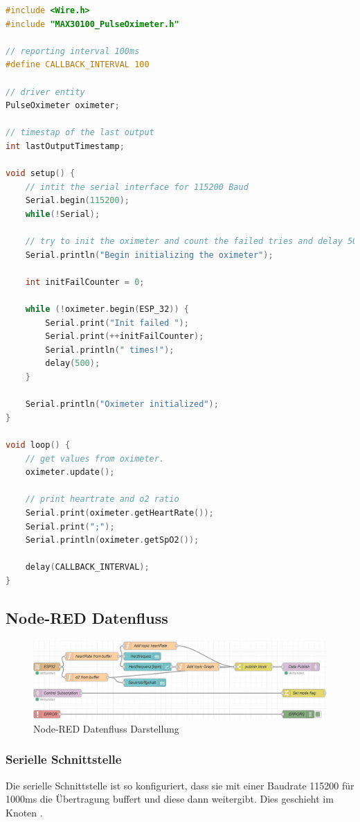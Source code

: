 \documentclass[12pt,oneside]{article}
\newcommand{\quoteM}[1]{\glqq {#1}\grqq{}}
\begin{document}
  \begin{lstlisting}[language=C, caption={Quellcode des ESP32-Programms}, captionpos=b, label=srcEsp]
#include <Wire.h>
#include "MAX30100_PulseOximeter.h"

// reporting interval 100ms
#define CALLBACK_INTERVAL 100

// driver entity
PulseOximeter oximeter;

// timestap of the last output
int lastOutputTimestamp;

void setup() {
	// intit the serial interface for 115200 Baud
	Serial.begin(115200);
	while(!Serial);
	
	// try to init the oximeter and count the failed tries and delay 500ms.
	Serial.println("Begin initializing the oximeter");
	
	int initFailCounter = 0;
	
	while (!oximeter.begin(ESP_32)) {
		Serial.print("Init failed ");
		Serial.print(++initFailCounter);
		Serial.println(" times!");
		delay(500);
	}
	
	Serial.println("Oximeter initialized");
}

void loop() {
	// get values from oximeter.
	oximeter.update();
	
	// print heartrate and o2 ratio
	Serial.print(oximeter.getHeartRate());
	Serial.print(";");
	Serial.println(oximeter.getSpO2());
	
	delay(CALLBACK_INTERVAL);
}
  \end{lstlisting}

  \subsection{Node-RED Datenfluss}
  \begin{figure}[tph!]
  	\includegraphics[width=\textwidth]{node red flow}
  	\caption{Node-RED\cite{nodeRED} Datenfluss Darstellung}
  	\label{fig:nodeRedFlow}
  \end{figure}
	\subsubsection*{Serielle Schnittstelle}
	  Die serielle Schnittstelle ist so konfiguriert, dass sie mit einer Baudrate 115200 für 1000ms die Übertragung buffert und diese dann weitergibt. Dies geschieht im Knoten \quoteM{ESP32}.
\end{document}
